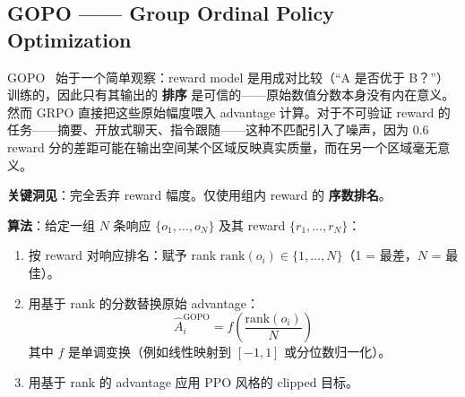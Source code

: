 \subsection{GOPO —— Group Ordinal Policy Optimization}
\label{gopo-group-ordinal-policy-optimization}

GOPO~\cite{choi2025gopo} 始于一个简单观察：reward model 是用成对比较（“A 是否优于 B？”）训练的，因此只有其输出的 \textbf{排序} 是可信的——原始数值分数本身没有内在意义。然而 GRPO 直接把这些原始幅度喂入 advantage 计算。对于不可验证 reward 的任务——摘要、开放式聊天、指令跟随——这种不匹配引入了噪声，因为 0.6 reward 分的差距可能在输出空间某个区域反映真实质量，而在另一个区域毫无意义。

\textbf{关键洞见}：完全丢弃 reward 幅度。仅使用组内 reward 的 \textbf{序数排名}。

\textbf{算法}：给定一组 $N$ 条响应 $\{o_1, \ldots, o_N\}$ 及其 reward $\{r_1, \ldots, r_N\}$：

\begin{enumerate}
  \item 按 reward 对响应排名：赋予 rank $\text{rank}(o_i) \in \{1, \ldots, N\}$（1 = 最差，$N$ = 最佳）。
  \item 用基于 rank 的分数替换原始 advantage：
\begin{equation}
\boxed{\hat{A}_i^{\text{GOPO}} = f\!\left(\frac{\text{rank}(o_i)}{N}\right)}
\end{equation}
 其中 $f$ 是单调变换（例如线性映射到 $[-1, 1]$ 或分位数归一化）。
  \item 用基于 rank 的 advantage 应用 PPO 风格的 clipped 目标。
\end{enumerate}


